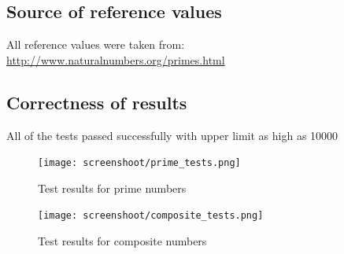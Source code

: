 \documentclass[12pt]{article}
\begin{document}
\subsection{Source of reference values}
All reference values were taken from: \href{http://www.naturalnumbers.org/primes.html}{http://www.naturalnumbers.org/primes.html}

\subsection{Correctness of results}
All of the tests passed successfully with upper limit as high as 10000

\begin{figure}[H]
    \caption{Test results for prime numbers}
\centering
\texttt{[image: screenshoot/prime\_tests.png]}
\end{figure}

\begin{figure}[H]
    \caption{Test results for composite numbers}
\centering
\texttt{[image: screenshoot/composite\_tests.png]}
\end{figure}
\end{document}
